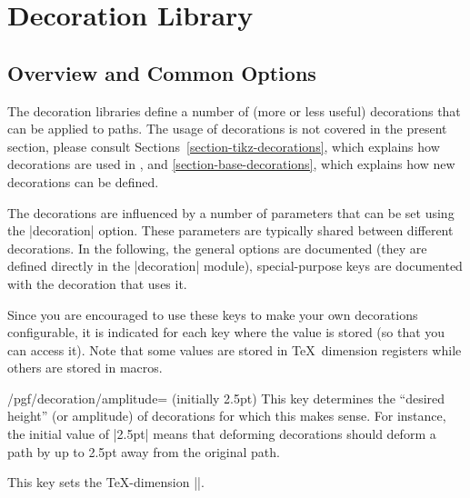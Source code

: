 %
%
%


\section{Decoration Library}
\label{section-library-decorations}


\subsection{Overview and Common Options}

The decoration libraries define a number of (more or less useful) decorations
that can be applied to paths. The usage of decorations is not covered in the
present section, please consult Sections~\ref{section-tikz-decorations}, which
explains how decorations are used in \tikzname, and
\ref{section-base-decorations}, which explains how new decorations can be
defined.
%
\begin{codeexample}
    \usetikzlibrary{
        decorations.footprints,
        decorations.fractals,
        decorations.markings,
        decorations.pathmorphing,
        decorations.pathreplacing,
        decorations.shapes,
        decorations.text,
    }
\end{codeexample}

The decorations are influenced by a number of parameters that can be set using
the |decoration| option. These parameters are typically shared between
different decorations. In the following, the general options are documented
(they are defined directly in the |decoration| module), special-purpose keys
are documented with the decoration that uses it.

Since you are encouraged to use these keys to make your own decorations
configurable, it is indicated for each key where the value is stored (so that
you can access it). Note that some values are stored in \TeX\ dimension
registers while others are stored in macros.

\begin{key}{/pgf/decoration/amplitude= (initially 2.5pt)}
    This key determines the ``desired height'' (or amplitude) of decorations
    for which this makes sense. For instance, the initial value of |2.5pt|
    means that deforming decorations should deform a path by up to 2.5pt away
    from the original path.

    This key sets the \TeX-dimension |\pgfdecorationsegmentamplitude|.
\end{key}

